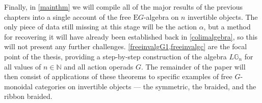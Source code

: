 Finally, in \cref{mainthm} we will compile all of the major results of the previous chapters into a single account of the free $\mathrm{E}G$-algebra on $n$ invertible objects. The only piece of data still missing at this stage will be the action $\alpha$, but a method for recovering it will have already been established back in \cref{colimalgebra}, so this will not present any further challenges. \cref{freeinvalgG1,freeinvalgc} are the focal point of the thesis, providing a step-by-step construction of the algebra $L\mathbb{G}_n$ for all values of $n \in \mathbb{N}$ and all action operads $G$. The remainder of the paper will then consist of applications of these theorems to specific examples of free $G$-monoidal categories on invertible objects --- the symmetric, the braided, and the ribbon braided.  




















